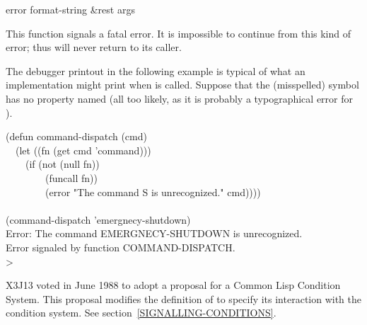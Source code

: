 \begin{defun}[Function]
error format-string &rest args

\begin{obsolete}\noindent
This function signals a fatal error.  It is impossible to continue
from this kind of 
error; thus  will never return to its caller.

The debugger printout in the following example is typical of what
an implementation might print when  is called.
Suppose that the (misspelled) symbol  has no property
named  (all too likely, as it is probably a typographical
error for ).
\begin{lisp}
(defun command-dispatch (cmd) \\
~~(let ((fn (get cmd 'command))) \\
~~~~(if (not (null fn)) \\
~~~~~~~~(funcall fn)) \\
~~~~~~~~(error "The command {\Xtilde}S is unrecognized." cmd)))) \\
 \\
(command-dispatch 'emergnecy-shutdown) \\
Error: The command EMERGNECY-SHUTDOWN is unrecognized. \\
Error signaled by function COMMAND-DISPATCH. \\
> 
\end{lisp}
\end{obsolete}

\begin{new}
X3J13 voted in June 1988
to adopt a proposal for a Common Lisp Condition System. 
This proposal modifies the definition of  to specify its interaction
with the condition system.  See section~\ref{SIGNALLING-CONDITIONS}.
\end{new}
\end{defun}

